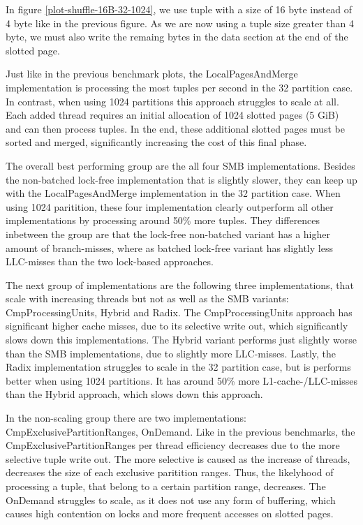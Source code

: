 In figure \ref{plot-shuffle-16B-32-1024}, we use tuple with a size of 16 byte instead of 4 byte like in the previous figure.
As we are now using a tuple size greater than 4 byte, we must also write the remaing bytes in the data section at the end of the slotted page.

Just like in the previous benchmark plots, the LocalPagesAndMerge implementation is processing the most tuples per second in the 32 partition case.
In contrast, when using 1024 partitions this approach struggles to scale at all.
Each added thread requires an initial allocation of 1024 slotted pages (5 GiB) and can then process tuples.
In the end, these additional slotted pages must be sorted and merged, significantly increasing the cost of this final phase.

The overall best performing group are the all four \ac{SMB} implementations.
Besides the non-batched lock-free implementation that is slightly slower, they can keep up with the LocalPagesAndMerge implementation in the 32 partition case.
When using 1024 paritition, these four implementation clearly outperform all other implementations by processing around 50\% more tuples.
They differences inbetween the group are that the lock-free non-batched variant has a higher amount of branch-misses, where as batched lock-free variant has slightly less \ac{LLC}-misses than the two lock-based approaches.

The next group of implementations are the following three implementations, that scale with increasing threads but not as well as the \ac{SMB} variants: CmpProcessingUnits, Hybrid and Radix.
The CmpProcessingUnits approach has significant higher cache misses, due to its selective write out, which significantly slows down this implementations.
The Hybrid variant performs just slightly worse than the \ac{SMB} implementations, due to slightly more \ac{LLC}-misses.
Lastly, the Radix implementation struggles to scale in the 32 partition case, but is performs better when using 1024 partitions.
It has around 50\% more L1-cache-/\ac{LLC}-misses than the Hybrid approach, which slows down this approach.

In the non-scaling group there are two implementations: CmpExclusivePartitionRanges, OnDemand.
Like in the previous benchmarks, the CmpExclusivePartitionRanges per thread efficiency decreases due to the more selective tuple write out.
The more selective is caused as the increase of threads, decreases the size of each exclusive paritition ranges.
Thus, the likelyhood of processing a tuple, that belong to a certain partition range, decreases.
The OnDemand struggles to scale, as it does not use any form of buffering, which causes high contention on locks and more frequent accesses on slotted pages.

